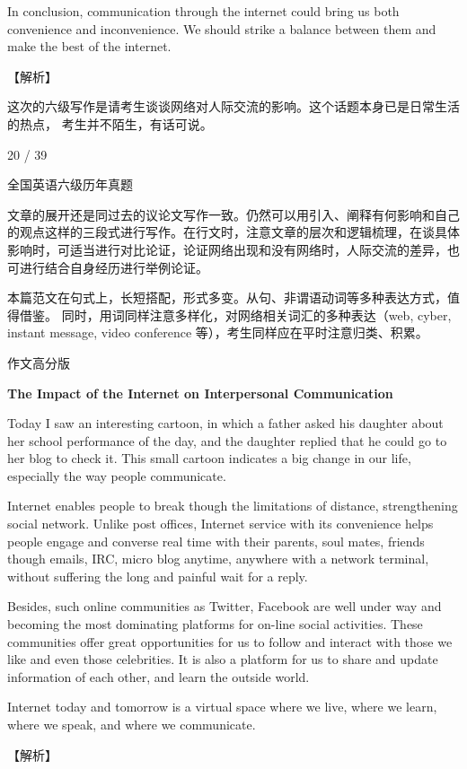 \documentclass[UTF8,11pt]{ctexart}
\begin{document}
In conclusion, communication through the internet could bring us both convenience and inconvenience. We should strike a balance between them and make the best of the internet.


【解析】


这次的六级写作是请考生谈谈网络对人际交流的影响。这个话题本身已是日常生活的热点， 考生并不陌生，有话可说。


20 / 39


全国英语六级历年真题


文章的展开还是同过去的议论文写作一致。仍然可以用引入、阐释有何影响和自己的观点这样的三段式进行写作。在行文时，注意文章的层次和逻辑梳理，在谈具体影响时，可适当进行对比论证，论证网络出现和没有网络时，人际交流的差异，也可进行结合自身经历进行举例论证。


本篇范文在句式上，长短搭配，形式多变。从句、非谓语动词等多种表达方式，值得借鉴。 同时，用词同样注意多样化，对网络相关词汇的多种表达（web, cyber, instant message, video conference 等），考生同样应在平时注意归类、积累。


作文高分版


\textbf{The Impact of the Internet on Interpersonal Communication}


Today I saw an interesting cartoon, in which a father asked his daughter about her school performance of the day, and the daughter replied that he could go to her blog to check it. This small cartoon indicates a big change in our life, especially the way people communicate.


Internet enables people to break though the limitations of distance, strengthening social network. Unlike post offices, Internet service with its convenience helps people engage and converse real time with their parents, soul mates, friends though emails, IRC, micro blog anytime, anywhere with a network terminal, without suffering the long and painful wait for a reply.


Besides, such online communities as Twitter, Facebook are well under way and becoming the most dominating platforms for on-line social activities. These communities offer great opportunities for us to follow and interact with those we like and even those celebrities. It is also a platform for us to share and update information of each other, and learn the outside world.


Internet today and tomorrow is a virtual space where we live, where we learn, where we speak, and where we communicate.


【解析】
\end{document}
